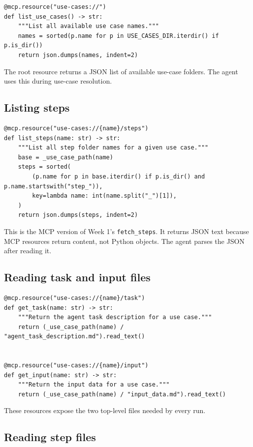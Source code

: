 \documentclass[12pt, a4paper]{article}
\begin{document}
\begin{lstlisting}[style=pythonstyle]
@mcp.resource("use-cases://")
def list_use_cases() -> str:
    """List all available use case names."""
    names = sorted(p.name for p in USE_CASES_DIR.iterdir() if p.is_dir())
    return json.dumps(names, indent=2)
\end{lstlisting}

The root resource returns a JSON list of available use-case folders. The agent uses this during use-case resolution.

\subsection{Listing steps}

\begin{lstlisting}[style=pythonstyle]
@mcp.resource("use-cases://{name}/steps")
def list_steps(name: str) -> str:
    """List all step folder names for a given use case."""
    base = _use_case_path(name)
    steps = sorted(
        (p.name for p in base.iterdir() if p.is_dir() and p.name.startswith("step_")),
        key=lambda name: int(name.split("_")[1]),
    )
    return json.dumps(steps, indent=2)
\end{lstlisting}

This is the MCP version of Week 1's \texttt{fetch\_steps}. It returns JSON text because MCP resources return content, not Python objects. The agent parses the JSON after reading it.

\subsection{Reading task and input files}

\begin{lstlisting}[style=pythonstyle]
@mcp.resource("use-cases://{name}/task")
def get_task(name: str) -> str:
    """Return the agent task description for a use case."""
    return (_use_case_path(name) / "agent_task_description.md").read_text()


@mcp.resource("use-cases://{name}/input")
def get_input(name: str) -> str:
    """Return the input data for a use case."""
    return (_use_case_path(name) / "input_data.md").read_text()
\end{lstlisting}

These resources expose the two top-level files needed by every run.

\subsection{Reading step files}
\end{document}
